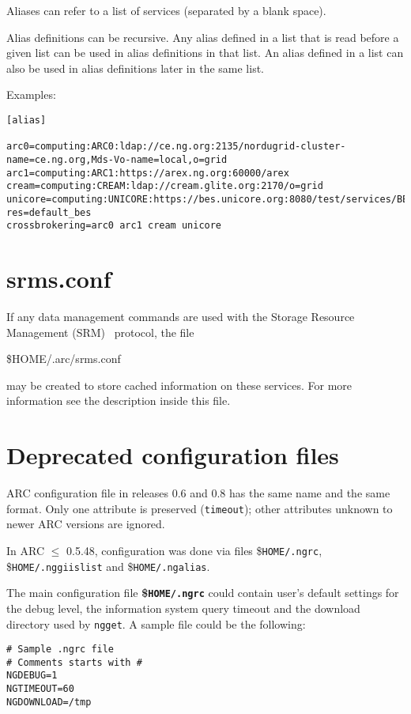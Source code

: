  Aliases can refer to a list of services (separated by a blank space).

 Alias definitions can be recursive. Any alias
 defined in a list that is read before a given list can be used in
 alias definitions in that list. An alias defined in a list can also
 be used in alias definitions later in the same list.

 Examples:
\begin{verbatim}
[alias]

arc0=computing:ARC0:ldap://ce.ng.org:2135/nordugrid-cluster-name=ce.ng.org,Mds-Vo-name=local,o=grid
arc1=computing:ARC1:https://arex.ng.org:60000/arex
cream=computing:CREAM:ldap://cream.glite.org:2170/o=grid
unicore=computing:UNICORE:https://bes.unicore.org:8080/test/services/BESFactory?res=default_bes
crossbrokering=arc0 arc1 cream unicore
\end{verbatim}

\section{srms.conf}

If any data management commands are used with the Storage Resource
Management (SRM)~\cite{srm} protocol, the file
 
\begin{shaded}
 {\$}HOME/.arc/srms.conf
\end{shaded}
 
may be created to store cached information on these services. For more
information see the description inside this file.

\section{Deprecated configuration files}

ARC configuration file in releases 0.6 and 0.8 has the same name and the same
format. Only one attribute is preserved (\texttt{timeout}); other attributes
unknown to newer ARC versions are ignored.

In ARC $\leq$ 0.5.48, configuration was done via files {\$}\texttt{HOME/.ngrc},
{\$}\texttt{HOME/.nggiislist} and {\$}\texttt{HOME/.ngalias}.

The main configuration file \textbf{{\$}\texttt{HOME/.ngrc}} could contain
user's default settings for the debug level, the information system
query timeout and the download directory used by \texttt{ngget}. A
sample file could be the following:
\begin{verbatim}
# Sample .ngrc file
# Comments starts with #
NGDEBUG=1
NGTIMEOUT=60
NGDOWNLOAD=/tmp
\end{verbatim}

